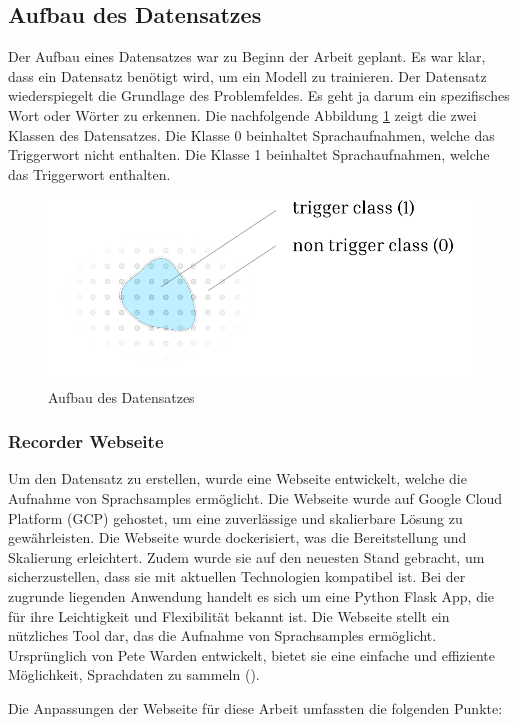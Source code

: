 \documentclass[11pt,a4paper]{article}
\begin{document}
\subsection{Aufbau des Datensatzes}
Der Aufbau eines Datensatzes war zu Beginn der Arbeit geplant. Es war klar, dass ein Datensatz 
benötigt wird, um ein Modell zu trainieren. Der Datensatz wiederspiegelt die Grundlage des 
Problemfeldes. Es geht ja darum ein spezifisches Wort oder Wörter zu erkennen. Die nachfolgende 
Abbildung \ref{fig:dataset} zeigt die zwei Klassen des Datensatzes. Die Klasse 0 beinhaltet 
Sprachaufnahmen, welche das Triggerwort nicht enthalten. Die Klasse 1 beinhaltet Sprachaufnahmen, 
welche das Triggerwort enthalten.

\hspace*{-1.5cm}
\begin{figure}[h]
	\centering
	\includegraphics[width=0.75\linewidth]{img/dataset.pdf}
	\caption{Aufbau des Datensatzes}
	\label{fig:dataset} 
\end{figure}

\subsubsection{Recorder Webseite}
Um den Datensatz zu erstellen, wurde eine Webseite entwickelt, welche die Aufnahme von Sprachsamples 
ermöglicht. Die Webseite wurde auf Google Cloud Platform (GCP) gehostet, um eine zuverlässige und
skalierbare Lösung zu gewährleisten. Die Webseite wurde dockerisiert, was die Bereitstellung und 
Skalierung erleichtert. Zudem wurde sie auf den neuesten Stand gebracht, um sicherzustellen, dass 
sie mit aktuellen Technologien kompatibel ist. Bei der zugrunde liegenden Anwendung handelt es sich 
um eine Python Flask App, die für ihre Leichtigkeit und Flexibilität bekannt ist. Die Webseite 
stellt ein nützliches Tool dar, das die Aufnahme von Sprachsamples ermöglicht. Ursprünglich von 
Pete Warden entwickelt, bietet sie eine einfache und effiziente Möglichkeit, Sprachdaten zu sammeln 
(\cite{warden2018speech}).

\noindent \newline
Die Anpassungen der Webseite für diese Arbeit umfassten die folgenden Punkte:
\end{document}
